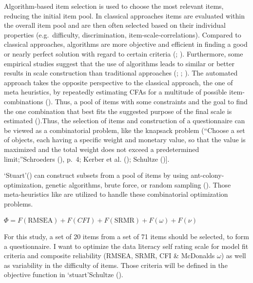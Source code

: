 \documentclass[
  12pt,
  a4paper,
  twoside]{article}
\begin{document}
Algorithm-based item selection is used to choose the most relevant items, reducing the initial item pool. In classical approaches items are evaluated within the overall item pool and are then often selected based on their individual properties (e.g.~difficulty, discrimination, item-scale-correlations).
Compared to classical approaches, algorithms are more objective and efficient in finding a good or nearly perfect solution with regard to certain criteria (; ). Furthermore, some empirical studies suggest that the use of algorithms leads to similar or better results in scale construction than traditional approaches (; ; ). The automated approach takes the opposite perspective to the classical approach, the one of meta heuristics, by repeatedly estimating CFAs for a multitude of possible item-combinations (). Thus, a pool of items with some constraints and the goal to find the one combination that best fits the suggested purpose of the final scale is estimated ().Thus, the selection of items and construction of a questionnaire can be viewed as a combinatorial problem, like the knapsack problem (``Choose a set of objects, each having a specific weight and monetary value, so that the value is maximized and the total weight does not exceed a predetermined limit;''Schroeders (), p.~4; Kerber et al. (); Schultze (){]}.

`Stuart'() can construct subsets from a pool of items by using ant-colony- optimization, genetic algorithms, brute force, or random sampling (). Those meta-heuristics like are utilized to handle these combinatorial optimization problems.

\begin{center}
$\Phi = F(\textrm{RMSEA}) + F(CFI)+ F(\textrm{SRMR}) + F(\omega) + F(\nu)$
\end{center}

For this study, a set of 20 items from a set of 71 items should be selected, to form a questionnaire. I want to optimize the data literacy self rating scale for model fit criteria and composite reliability (RMSEA, SRMR, CFI \& McDonalds \(\omega\)) as well as variability in the difficulty of items. Those criteria will be defined in the objective function in `stuart'Schultze ().
\end{document}
